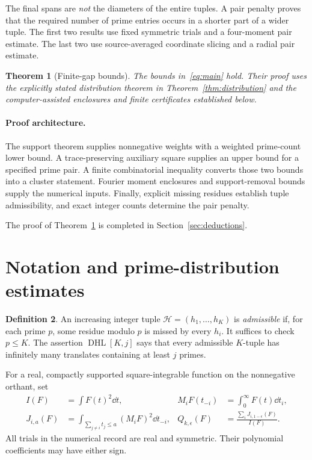 \documentclass[11pt,a4paper]{article}
\newtheorem{theorem}{Theorem}[section]
\theoremstyle{definition}\newtheorem{definition}[theorem]{Definition}
\theoremstyle{remark}\newtheorem{remark}[theorem]{Remark}
\newcommand{\DHL}{\operatorname{DHL}}
\numberwithin{equation}{section}
\begin{document}
The final spans are \emph{not} the diameters of the entire tuples. A pair penalty proves that the required number of prime entries occurs in a shorter part of a wider tuple. The first two results use fixed symmetric trials and a four-moment pair estimate. The last two use source-averaged coordinate slicing and a radial pair estimate.

\begin{theorem}[Finite-gap bounds]\label{thm:main}
The bounds in~\eqref{eq:main} hold. Their proof uses the explicitly stated distribution theorem in Theorem~\ref{thm:distribution} and the computer-assisted enclosures and finite certificates established below.
\end{theorem}



\paragraph{Proof architecture.}
The support theorem supplies nonnegative weights with a weighted prime-count lower bound. A trace-preserving auxiliary square supplies an upper bound for a specified prime pair. A finite combinatorial inequality converts those two bounds into a cluster statement. Fourier moment enclosures and support-removal bounds supply the numerical inputs. Finally, explicit missing residues establish tuple admissibility, and exact integer counts determine the pair penalty.

The proof of Theorem~\ref{thm:main} is completed in Section~\ref{sec:deductions}.

\section{Notation and prime-distribution estimates}\label{sec:setup}
\begin{definition}
An increasing integer tuple $\mathcal H=(h_1,\ldots,h_K)$ is \emph{admissible} if, for each prime $p$, some residue modulo $p$ is missed by every $h_i$. It suffices to check $p\le K$. The assertion $\DHL[K,j]$ says that every admissible $K$-tuple has infinitely many translates containing at least $j$ primes.
\end{definition}

For a real, compactly supported square-integrable function on the nonnegative orthant, set
\begin{align}
 I(F)&=\int F(t)^2\dd t, & M_iF(t_{-i})&=\int_0^\infty F(t)\dd t_i,\\
 J_{i,a}(F)&=\int_{\sum_{j\ne i}t_j\le a}(M_iF)^2\dd t_{-i}, &
 Q_{k,\epsilon}(F)&=\frac{\sum_iJ_{i,1-\epsilon}(F)}{I(F)}.\label{eq:quotient}
\end{align}
All trials in the numerical record are real and symmetric. Their polynomial coefficients may have either sign.
\end{document}
